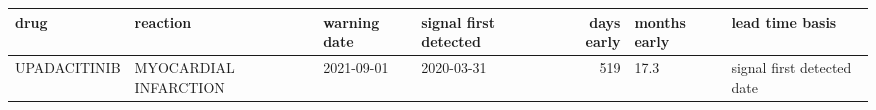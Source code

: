 \begin{tabular}{llllrll}
\toprule
drug & reaction & warning date & signal first detected & days early & months early & lead time basis \\
\midrule
UPADACITINIB & MYOCARDIAL INFARCTION & 2021-09-01 & 2020-03-31 & 519 & 17.3 & signal first detected date \\
\bottomrule
\end{tabular}
